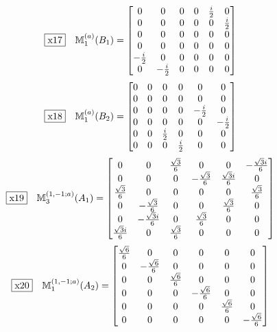 \documentclass[fleqn,10pt,landscape]{jsarticle}
\begin{document}
\begin{dmath*}
\fbox{x17}\quad \mathbb{M}_{1}^{(a)}(B_{1})=\begin{bmatrix} 0 & 0 & 0 & 0 & \frac{i}{2} & 0 \\ 0 & 0 & 0 & 0 & 0 & \frac{i}{2} \\ 0 & 0 & 0 & 0 & 0 & 0 \\ 0 & 0 & 0 & 0 & 0 & 0 \\ - \frac{i}{2} & 0 & 0 & 0 & 0 & 0 \\ 0 & - \frac{i}{2} & 0 & 0 & 0 & 0 \end{bmatrix}
\end{dmath*}
\begin{dmath*}
\fbox{x18}\quad \mathbb{M}_{1}^{(a)}(B_{2})=\begin{bmatrix} 0 & 0 & 0 & 0 & 0 & 0 \\ 0 & 0 & 0 & 0 & 0 & 0 \\ 0 & 0 & 0 & 0 & - \frac{i}{2} & 0 \\ 0 & 0 & 0 & 0 & 0 & - \frac{i}{2} \\ 0 & 0 & \frac{i}{2} & 0 & 0 & 0 \\ 0 & 0 & 0 & \frac{i}{2} & 0 & 0 \end{bmatrix}
\end{dmath*}
\begin{dmath*}
\fbox{x19}\quad \mathbb{M}_{3}^{(1,-1;a)}(A_{1})=\begin{bmatrix} 0 & 0 & \frac{\sqrt{3}}{6} & 0 & 0 & - \frac{\sqrt{3} i}{6} \\ 0 & 0 & 0 & - \frac{\sqrt{3}}{6} & \frac{\sqrt{3} i}{6} & 0 \\ \frac{\sqrt{3}}{6} & 0 & 0 & 0 & 0 & \frac{\sqrt{3}}{6} \\ 0 & - \frac{\sqrt{3}}{6} & 0 & 0 & \frac{\sqrt{3}}{6} & 0 \\ 0 & - \frac{\sqrt{3} i}{6} & 0 & \frac{\sqrt{3}}{6} & 0 & 0 \\ \frac{\sqrt{3} i}{6} & 0 & \frac{\sqrt{3}}{6} & 0 & 0 & 0 \end{bmatrix}
\end{dmath*}
\begin{dmath*}
\fbox{x20}\quad \mathbb{M}_{1}^{(1,-1;a)}(A_{2})=\begin{bmatrix} \frac{\sqrt{6}}{6} & 0 & 0 & 0 & 0 & 0 \\ 0 & - \frac{\sqrt{6}}{6} & 0 & 0 & 0 & 0 \\ 0 & 0 & \frac{\sqrt{6}}{6} & 0 & 0 & 0 \\ 0 & 0 & 0 & - \frac{\sqrt{6}}{6} & 0 & 0 \\ 0 & 0 & 0 & 0 & \frac{\sqrt{6}}{6} & 0 \\ 0 & 0 & 0 & 0 & 0 & - \frac{\sqrt{6}}{6} \end{bmatrix}
\end{dmath*}
\end{document}
